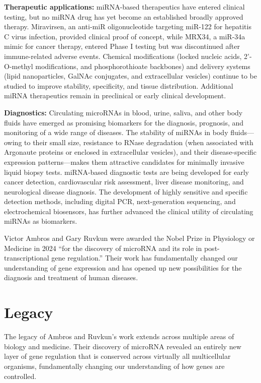 \textbf{Therapeutic applications:} miRNA-based therapeutics have entered clinical testing, but no miRNA drug has yet become an established broadly approved therapy. Miravirsen, an anti-miR oligonucleotide targeting miR-122 for hepatitis C virus infection, provided clinical proof of concept, while MRX34, a miR-34a mimic for cancer therapy, entered Phase I testing but was discontinued after immune-related adverse events. Chemical modifications (locked nucleic acids, 2'-O-methyl modifications, and phosphorothioate backbones) and delivery systems (lipid nanoparticles, GalNAc conjugates, and extracellular vesicles) continue to be studied to improve stability, specificity, and tissue distribution. Additional miRNA therapeutics remain in preclinical or early clinical development.

\textbf{Diagnostics:} Circulating microRNAs in blood, urine, saliva, and other body fluids have emerged as promising biomarkers for the diagnosis, prognosis, and monitoring of a wide range of diseases. The stability of miRNAs in body fluids---owing to their small size, resistance to RNase degradation (when associated with Argonaute proteins or enclosed in extracellular vesicles), and their disease-specific expression patterns---makes them attractive candidates for minimally invasive liquid biopsy tests. miRNA-based diagnostic tests are being developed for early cancer detection, cardiovascular risk assessment, liver disease monitoring, and neurological disease diagnosis. The development of highly sensitive and specific detection methods, including digital PCR, next-generation sequencing, and electrochemical biosensors, has further advanced the clinical utility of circulating miRNAs as biomarkers.

Victor Ambros and Gary Ruvkun were awarded the Nobel Prize in Physiology or Medicine in 2024 ``for the discovery of microRNA and its role in post-transcriptional gene regulation.'' Their work has fundamentally changed our understanding of gene expression and has opened up new possibilities for the diagnosis and treatment of human diseases.

\section{Legacy}

The legacy of Ambros and Ruvkun's work extends across multiple areas of biology and medicine. Their discovery of microRNA revealed an entirely new layer of gene regulation that is conserved across virtually all multicellular organisms, fundamentally changing our understanding of how genes are controlled.

